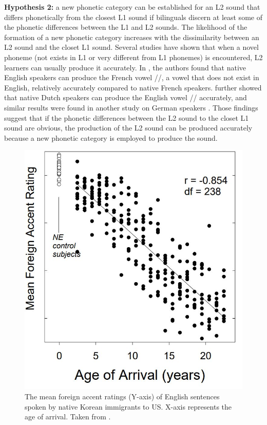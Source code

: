 \textbf{Hypothesis 2:} a new phonetic category can be established for an L2 sound that differs phonetically from the closest L1 sound if bilinguals discern at least some of the phonetic differences between the L1 and L2 sounds. The likelihood of the formation of a new phonetic category increases with the dissimilarity between an L2 sound and the closet L1 sound. Several studies have shown that when a novel phoneme (not exists in L1 or very different from L1 phonemes) is encountered, L2 learners can usually produce it accurately. In \citep{flege1987production}, the authors found that native English speakers can produce the French vowel //, a vowel that does not exist in English, relatively accurately compared to native French speakers. \cite{flege1997english} further showed that native Dutch speakers can produce the English vowel /\textipa{\ae}/ accurately, and similar results were found in another study on German speakers \citep{flege1997perception}. Those findings suggest that if the phonetic differences between the L2 sound to the closet L1 sound are obvious, the production of the L2 sound can be produced accurately because a new phonetic category is employed to produce the sound.

\begin{figure}
\centering
\captionsetup{justification=centering}
\includegraphics[width = 0.8\linewidth]{figures/accentedness_AOA.JPG}
\caption{The mean foreign accent ratings (Y-axis) of English sentences spoken by native Korean immigrants to US. X-axis represents the age of arrival. Taken from \citep{flege1999native}.}
\label{fig:accent_example}
\end{figure}

